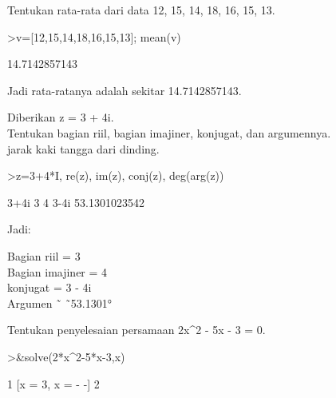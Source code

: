 \documentclass[a4paper,10pt]{article}
\begin{document}
\begin{eulernotebook}
\begin{eulercomment}
Tentukan rata-rata dari data 12, 15, 14, 18, 16, 15, 13.
\end{eulercomment}
\begin{eulerprompt}
>v=[12,15,14,18,16,15,13]; mean(v)
\end{eulerprompt}
\begin{euleroutput}
  14.7142857143
\end{euleroutput}
\begin{eulercomment}
Jadi rata-ratanya adalah sekitar 14.7142857143.
\end{eulercomment}
\begin{eulercomment}
Diberikan z = 3 + 4i.\\
Tentukan bagian riil, bagian imajiner, konjugat, dan argumennya.\\
jarak kaki tangga dari dinding.
\end{eulercomment}
\begin{eulerprompt}
>z=3+4*I, re(z), im(z), conj(z), deg(arg(z))
\end{eulerprompt}
\begin{euleroutput}
  3+4i
  3
  4
  3-4i
  53.1301023542
\end{euleroutput}
\begin{eulercomment}
Jadi:

Bagian riil = 3\\
Bagian imajiner = 4\\
konjugat = 3 - 4i\\
Argumen ˜ ˜53.1301°
\end{eulercomment}
\begin{eulercomment}
Tentukan penyelesaian persamaan 2x\textasciicircum{}2 - 5x - 3 = 0.
\end{eulercomment}
\begin{eulerprompt}
>&solve(2*x^2-5*x-3,x)
\end{eulerprompt}
\begin{euleroutput}
  
                                           1
                             [x = 3, x = - -]
                                           2
  
\end{euleroutput}
\end{eulernotebook}
\end{document}
